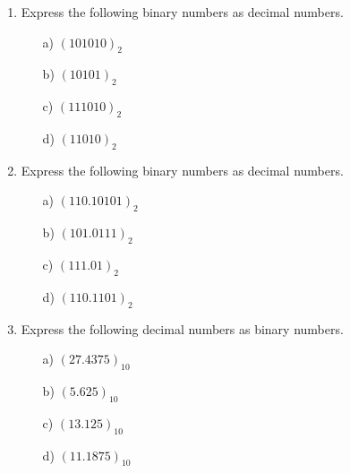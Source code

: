 \documentclass[]{report}
\begin{document}
\begin{enumerate}
\item Express the following binary numbers as decimal numbers.
  \begin{multicols}{4}
    \begin{itemize}
    \item[a)] $(101010)_{2}$
    \item[b)] $(10101)_{2}$
    \item[c)] $(111010)_{2}$
    \item[d)] $(11010)_{2}$
    \end{itemize}
  \end{multicols}
  \item Express the following binary numbers as decimal numbers.
  \begin{multicols}{4}
    \begin{itemize}
    \item[a)] $(110.10101)_{2}$
    \item[b)] $(101.0111)_{2}$
    \item[c)] $(111.01)_{2}$
    \item[d)] $(110.1101)_{2}$
    \end{itemize}
  \end{multicols}
\item Express the following decimal numbers as binary numbers.
  \begin{multicols}{4}
    \begin{itemize}
    \item[a)] $(27.4375)_{10}$  %
    \item[b)] $(5.625)_{10}$
    \item[c)] $(13.125)_{10}$
    \item[d)] $(11.1875)_{10}$
    \end{itemize}
  \end{multicols}
\end{enumerate}
\newpage
\end{document}

